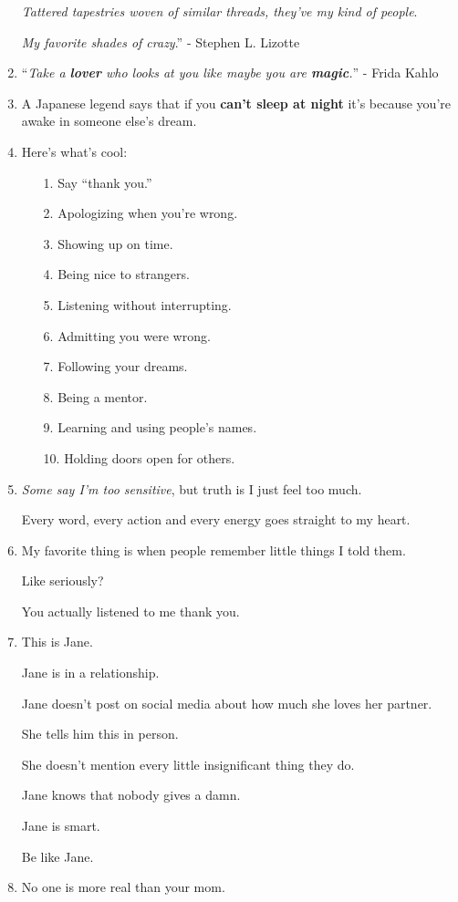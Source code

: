\documentclass{article}
\begin{document}
\begin{enumerate}
	\textit{Tattered tapestries woven of similar threads, they've my kind of people}.
	
	\textit{My favorite shades of crazy}.'' - Stephen L. Lizotte
	\item ``\textit{Take a \textbf{lover} who looks at you like maybe you are \textbf{magic}.}'' - Frida Kahlo
	\item A Japanese legend says that if you \textbf{can't sleep at night} it's because you're awake in someone else's dream.
	\item Here's what's cool:
	\begin{itemize}
		\item[1.] Say ``thank you.''
		\item[2.] Apologizing when you're wrong.
		\item[3.] Showing up on time.
		\item[4.] Being nice to strangers.
		\item[5.] Listening without interrupting.
		\item[6.] Admitting you were wrong.
		\item[7.] Following your dreams.
		\item[8.] Being a mentor.
		\item[9.] Learning and using people's names.
		\item[10.] Holding doors open for others.
	\end{itemize}
	\item \textit{Some say I'm too sensitive}, but truth is I just feel too much.
	
	Every word, every action and every energy goes straight to my heart.
	\item My favorite thing is when people remember little things I told them.
	
	Like seriously?
	
	You actually listened to me thank you.
	\item This is Jane.
	
	Jane is in a relationship.
	
	Jane doesn't post on social media about how much she loves her partner.
	
	She tells him this in person.
	
	She doesn't mention every little insignificant thing they do.
	
	Jane knows that nobody gives a damn.
	
	Jane is smart.
	
	Be like Jane.
	\item No one is more real than your mom.
	

\end{enumerate}
\end{document}
